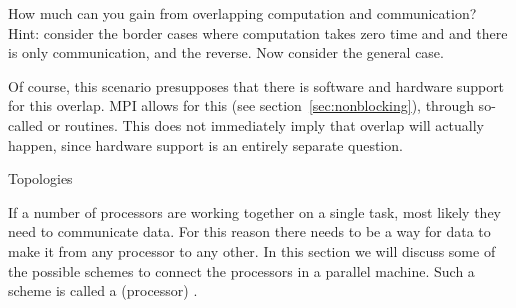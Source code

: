 \begin{exercise}
  How much can you gain from overlapping computation and
  communication?  Hint: consider the border cases where computation
  takes zero time and and there is only communication, and the
  reverse. Now consider the general case.
\end{exercise}

Of course, this scenario presupposes that there is software and
hardware support for this overlap. MPI allows for this (see
section~\ref{sec:nonblocking}), through so-called
 or  routines. This does not immediately imply that
overlap will actually happen, since hardware support is an entirely
separate question.


 {Topologies}

If a number of processors are working together on a single task, most
likely they need to communicate data. For this reason there needs to
be a way for data to make it from any processor to any other. In this
section we will discuss some of the possible schemes to connect the
processors in a parallel machine. Such a scheme is called a
(processor) .

